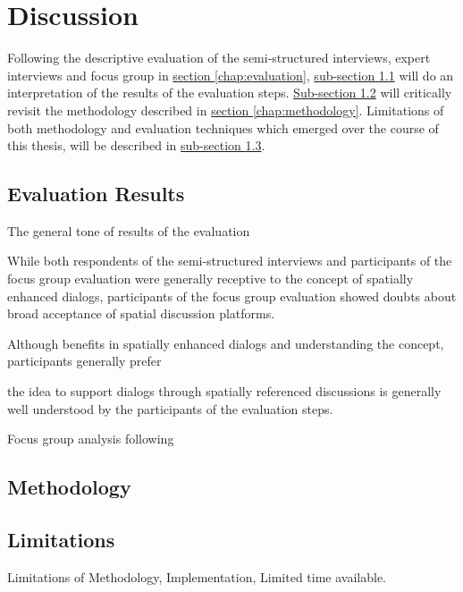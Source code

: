 \section{Discussion}
\label{chap:discussion}
Following the descriptive evaluation of the semi-structured interviews, expert interviews and focus group in \hyperref[chap:evaluation]{section \ref{chap:evaluation}}, \hyperref[sub:evaluation-results]{sub-section \ref{sub:evaluation-results}} will do an interpretation of the results of the evaluation steps. \hyperref[sub:method-discussion]{Sub-section \ref{sub:method-discussion}} will critically revisit the methodology described in \hyperref[chap:methodology]{section \ref{chap:methodology}}. Limitations of both methodology and evaluation techniques which emerged over the course of this thesis, will be described in \hyperref[sub:limitations]{sub-section \ref{sub:limitations}}.

\subsection{Evaluation Results}
\label{sub:evaluation-results}
The general tone of results of the evaluation 

While both respondents of the semi-structured interviews and participants of the focus group evaluation were generally receptive to the concept of spatially enhanced dialogs, participants of the focus group evaluation showed doubts about broad acceptance of spatial discussion platforms. 

Although  benefits in spatially enhanced dialogs and understanding the concept, participants generally prefer 

the idea to support dialogs through spatially referenced discussions is generally well understood by the participants of the evaluation steps.


Focus group analysis following \cite{asbury1995overview}

\subsection{Methodology}
\label{sub:method-discussion}

\subsection{Limitations}
\label{sub:limitations}

Limitations of Methodology, Implementation, Limited time available.


